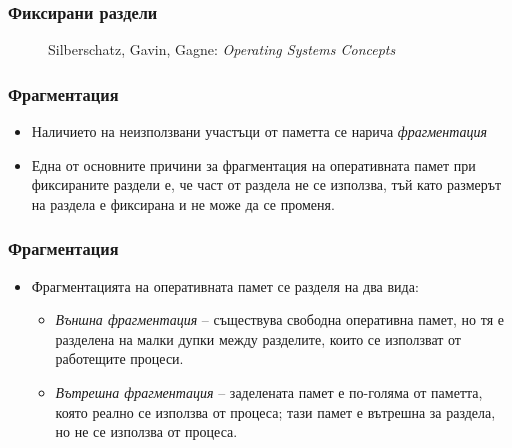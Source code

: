 \documentclass[ignorenonframetext, hyperref=unicode]{beamer}
\begin{document}
\begin{frame}
\frametitle{Фиксирани раздели}
\begin{figure}[h]
\center
{}
\caption{Silberschatz, Gavin, Gagne: {\em Operating Systems Concepts}}
\end{figure}
\end{frame}

\begin{frame}
\frametitle{Фрагментация}
\begin{itemize}
  \item Наличието на неизползвани участъци от паметта се нарича {\em
  фрагментация}
  \item Една от основните причини за фрагментация на оперативната памет при
  фиксираните раздели е, че част от раздела не се използва, тъй като размерът на
  раздела е фиксирана и не може да се променя.
\end{itemize}
\end{frame}

\begin{frame}
\frametitle{Фрагментация}
\begin{itemize}
  \item Фрагментацията на оперативната памет се разделя на два вида:
  \begin{itemize}
    \item {\em Външна фрагментация} -- съществува свободна оперативна памет, но
    тя е разделена на малки дупки между разделите, които се използват от работещите
    процеси.
    \item {\em Вътрешна фрагментация} -- заделената памет е по-голяма от
    паметта, която реално се използва от процеса; тази памет е вътрешна за раздела, но
    не се използва от процеса.
  \end{itemize}
  
\end{itemize}
\end{frame}
\end{document}
